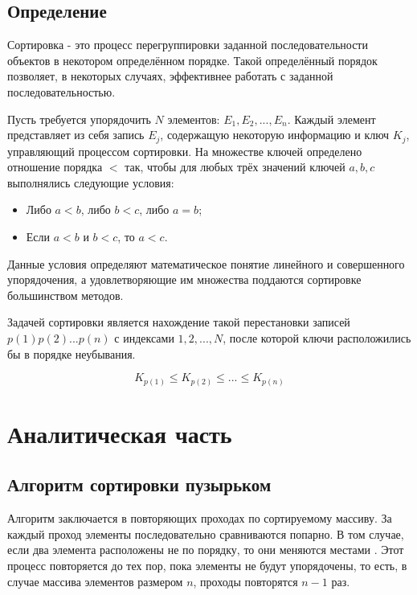 \documentclass[12pt]{report}
\begin{document}
\section*{Определение}
Сортировка - это процесс перегруппировки заданной последовательности объектов в некотором определённом порядке. Такой определённый порядок позволяет, в некоторых случаях, эффективнее работать с заданной последовательностью.

Пусть требуется упорядочить $N$ элементов: $E_1,E_2,...,E_n$. Каждый элемент представляет из себя запись $E_j$, содержащую некоторую информацию и ключ $K_j$, управляющий процессом сортировки. На множестве ключей определено отношение порядка $<$ так, чтобы для любых трёх значений ключей $a,b,c$ выполнялись следующие условия:

\begin{itemize}
\item Либо $a < b$, либо $b < c$, либо $a = b$;
\item Если $a < b$ и $b < c$, то $a < c$.
\end{itemize}

Данные условия определяют математическое понятие линейного и совершенного упорядочения, а удовлетворяющие им множества поддаются сортировке большинством методов.

Задачей сортировки является нахождение такой перестановки записей $p(1)p(2)...p(n)$ с индексами ${1, 2, ..., N}$, после которой ключи расположились бы в порядке неубывания.

\begin{equation}
K_{p(1)} \leq K_{p(2)} \leq ... \leq K_{p(n)}
\end{equation}

\chapter{Аналитическая часть}

\section{Алгоритм сортировки пузырьком}
Алгоритм заключается в повторяющих проходах по сортируемому массиву. За каждый проход элементы последовательно сравниваются попарно. В том случае, если два элемента расположены не по порядку, то они меняются местами \cite{Knut}. Этот процесс повторяется до тех пор, пока элементы не будут упорядочены, то есть, в случае массива элементов размером $n$, проходы повторятся $n - 1$ раз.
\end{document}
